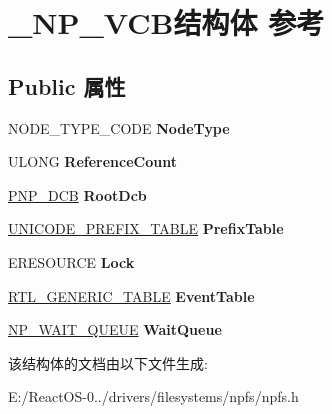 \hypertarget{struct___n_p___v_c_b}{}\section{\+\_\+\+N\+P\+\_\+\+V\+C\+B结构体 参考}
\label{struct___n_p___v_c_b}
\subsection*{Public 属性}
\begin{DoxyCompactItemize}
\item 
\mbox{\label{struct___n_p___v_c_b_a8f6eded3f3d7fdcb0d01d21bcdff95fa}} 
N\+O\+D\+E\+\_\+\+T\+Y\+P\+E\+\_\+\+C\+O\+DE {\bfseries Node\+Type}
\item 
\mbox{\label{struct___n_p___v_c_b_af1a2f92b7d411430ff326a7e75f4a0c0}} 
U\+L\+O\+NG {\bfseries Reference\+Count}
\item 
\mbox{\label{struct___n_p___v_c_b_a12893fa20bd46dea89f2dc1ad92a7f64}} 
\hyperlink{struct___n_p___d_c_b}{P\+N\+P\+\_\+\+D\+CB} {\bfseries Root\+Dcb}
\item 
\mbox{\label{struct___n_p___v_c_b_a3a7168c2c02a05d916043a57139849c8}} 
\hyperlink{struct___u_n_i_c_o_d_e___p_r_e_f_i_x___t_a_b_l_e}{U\+N\+I\+C\+O\+D\+E\+\_\+\+P\+R\+E\+F\+I\+X\+\_\+\+T\+A\+B\+LE} {\bfseries Prefix\+Table}
\item 
\mbox{\label{struct___n_p___v_c_b_a26a7368270987c9c8c4b85697762adba}} 
E\+R\+E\+S\+O\+U\+R\+CE {\bfseries Lock}
\item 
\mbox{\label{struct___n_p___v_c_b_af8e33c080c53ed1e19bd54c9909d4c11}} 
\hyperlink{struct___r_t_l___g_e_n_e_r_i_c___t_a_b_l_e}{R\+T\+L\+\_\+\+G\+E\+N\+E\+R\+I\+C\+\_\+\+T\+A\+B\+LE} {\bfseries Event\+Table}
\item 
\mbox{\label{struct___n_p___v_c_b_aecc8bfbf201415ecd809b8cc7454a85f}} 
\hyperlink{struct___n_p___w_a_i_t___q_u_e_u_e}{N\+P\+\_\+\+W\+A\+I\+T\+\_\+\+Q\+U\+E\+UE} {\bfseries Wait\+Queue}
\end{DoxyCompactItemize}


该结构体的文档由以下文件生成\+:\begin{DoxyCompactItemize}
\item 
E\+:/\+React\+O\+S-\/0../drivers/filesystems/npfs/npfs.\+h\end{DoxyCompactItemize}
